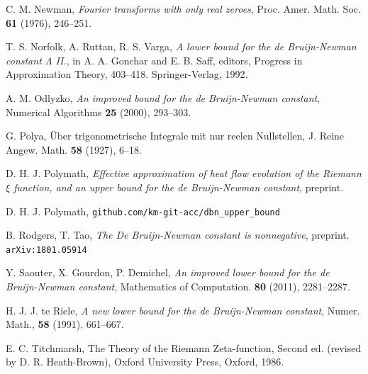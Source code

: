 \documentclass[a4paper,11pt,twoside]{amsart}
\begin{document}
\begin{thebibliography}{99}
C. M. Newman, \emph{Fourier transforms with only real zeroes}, Proc. Amer. Math. Soc. \textbf{61} (1976), 246--251.

T. S. Norfolk, A. Ruttan, R. S. Varga, \emph{A lower bound for the de Bruijn-Newman
constant $\Lambda$ II.}, in A. A. Gonchar and E. B. Saff, editors, Progress in Approximation
Theory, 403--418. Springer-Verlag, 1992.

A. M. Odlyzko, \emph{An improved bound for the de Bruijn-Newman constant}, Numerical Algorithms \textbf{25} (2000), 293--303.

%
%
G. Polya, {\"Uber trigonometrische Integrale mit nur reelen Nullstellen}, J. Reine Angew. Math. \textbf{58} (1927), 6--18. 

D. H. J. Polymath, \emph{Effective approximation of heat flow evolution of the Riemann $\xi$ function, and an upper bound for the de Bruijn-Newman constant}, preprint.

D. H. J. Polymath, {\tt github.com/km-git-acc/dbn\_upper\_bound}

B. Rodgers, T. Tao, \emph{The De Bruijn-Newman constant is nonnegative}, preprint. {\tt arXiv:1801.05914}

Y. Saouter, X. Gourdon, P. Demichel, \emph{An improved lower bound for the de Bruijn-Newman constant}, Mathematics of Computation. \textbf{80} (2011), 2281--2287. 

%

H. J. J. te Riele, \emph{A new lower bound for the de Bruijn-Newman constant}, Numer. Math., \textbf{58} (1991), 661--667.

E. C. Titchmarsh, The Theory of the Riemann Zeta-function, Second ed. (revised by D. R. Heath-Brown), Oxford University Press, Oxford, 1986.	


\end{thebibliography} 
\end{document}
